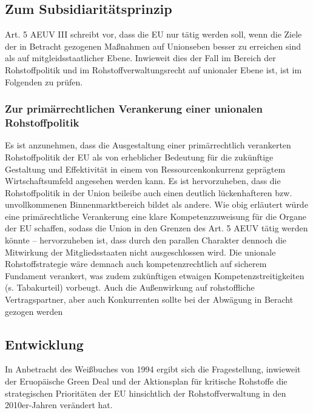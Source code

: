 \documentclass[12pt,a4paper,oneside]{book} %
\begin{document}
	\subsection{Zum Subsidiaritätsprinzip}
	Art. 5 AEUV III schreibt vor, dass die EU nur tätig werden soll, wenn die Ziele der in Betracht gezogenen Maßnahmen auf Unionseben besser zu erreichen sind als auf mitgleidsstaatlicher Ebene. Inwieweit dies der Fall im Bereich der Rohstoffpolitik und im Rohstoffverwaltungsrecht auf unionaler Ebene ist, ist im Folgenden zu prüfen.
	
	\subsubsection{Zur primärrechtlichen Verankerung einer unionalen Rohstoffpolitik}
	Es ist anzunehmen, dass die Ausgestaltung einer primärrechtlich verankerten Rohstoffpolitik der EU als von erheblicher Bedeutung für die zukünftige Gestaltung und Effektivität in einem von Ressourcenkonkurrenz geprägtem Wirtschaftsumfeld angesehen werden kann. Es ist hervorzuheben, dass die Rohstoffpolitik in der Union beileibe auch einen deutlich lückenhafteren bzw. unvollkommenen Binnenmarktbereich bildet als andere.  Wie obig erläutert würde eine primärechtliche Verankerung eine klare Kompetenzzuweisung für die Organe der EU schaffen, sodass die Union in den Grenzen des Art. 5 AEUV tätig werden könnte -- hervorzuheben ist, dass durch den parallen Charakter dennoch die Mitwirkung der Mitgliedsstaaten nicht ausgeschlossen wird. Die unionale Rohstoffstrategie wäre demnach auch kompetenzrechtlich auf sicherem Fundament verankert, was zudem zukünftigen etwaigen Kompetenzstreitigkeiten (s. Tabakurteil) vorbeugt. Auch die Außenwirkung auf rohstoffliche Vertragspartner, aber auch Konkurrenten sollte bei der Abwägung in Beracht gezogen werden
	
		
	\subsection{Entwicklung}
	
	In Anbetracht des Weißbuches von 1994 ergibt sich die Fragestellung, inwieweit der Eruopäische Green Deal und der Aktionsplan für kritische Rohstoffe die strategischen Prioritäten der EU hinsichtlich der Rohstoffverwaltung in den 2010er-Jahren verändert hat.
	
\end{document}
